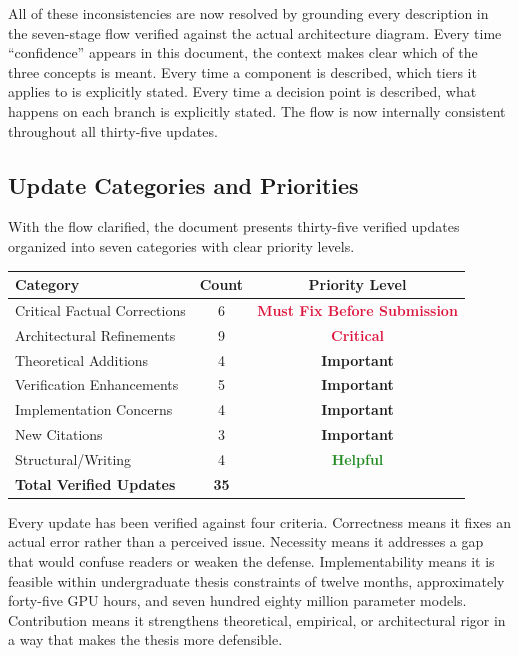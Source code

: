 \documentclass[11pt,a4paper]{article}
\begin{document}
All of these inconsistencies are now resolved by grounding every description in the seven-stage flow verified against the actual architecture diagram. Every time ``confidence'' appears in this document, the context makes clear which of the three concepts is meant. Every time a component is described, which tiers it applies to is explicitly stated. Every time a decision point is described, what happens on each branch is explicitly stated. The flow is now internally consistent throughout all thirty-five updates.

\subsection{Update Categories and Priorities}

With the flow clarified, the document presents thirty-five verified updates organized into seven categories with clear priority levels.

\begin{center}
\begin{tabular}{lcc}
\toprule
\rowcolor{LightNavy}
\textbf{Category} & \textbf{Count} & \textbf{Priority Level} \\
\midrule
Critical Factual Corrections & 6 & \textcolor{Crimson}{\textbf{Must Fix Before Submission}} \\
Architectural Refinements & 9 & \textcolor{Crimson}{\textbf{Critical}} \\
Theoretical Additions & 4 & \textcolor{Amber}{\textbf{Important}} \\
Verification Enhancements & 5 & \textcolor{Amber}{\textbf{Important}} \\
Implementation Concerns & 4 & \textcolor{Amber}{\textbf{Important}} \\
New Citations & 3 & \textcolor{Amber}{\textbf{Important}} \\
Structural/Writing & 4 & \textcolor{ForestGreen}{\textbf{Helpful}} \\
\midrule
\textbf{Total Verified Updates} & \textbf{35} & \\
\bottomrule
\end{tabular}
\end{center}

Every update has been verified against four criteria. Correctness means it fixes an actual error rather than a perceived issue. Necessity means it addresses a gap that would confuse readers or weaken the defense. Implementability means it is feasible within undergraduate thesis constraints of twelve months, approximately forty-five GPU hours, and seven hundred eighty million parameter models. Contribution means it strengthens theoretical, empirical, or architectural rigor in a way that makes the thesis more defensible.
\end{document}
